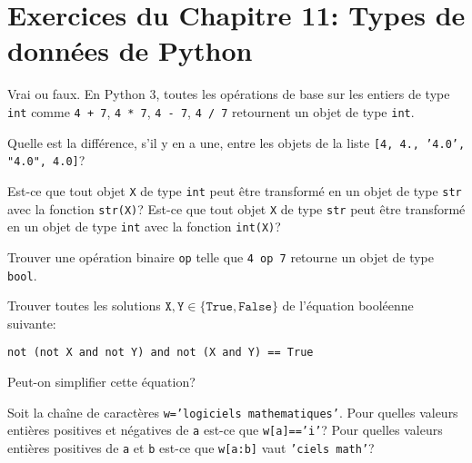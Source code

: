 
\section*{Exercices du Chapitre 11: Types de données de Python}

\begin{exercice}
    Vrai ou faux.
    En Python 3, toutes les opérations de base sur les entiers de type
    \texttt{int} comme 
    \texttt{4 + 7},
    \texttt{4 * 7},
    \texttt{4 - 7},
    \texttt{4 / 7}
    retournent un objet de type \texttt{int}.
\end{exercice}

\begin{exercice}
    Quelle est la différence, s'il y en a une, entre les objets de la liste
    \texttt{[4, 4., '4.0', "4.0", 4.0]}?
\end{exercice}

\begin{exercice}
    Est-ce que tout objet \texttt{X} de type \texttt{int} peut être
    transformé en un objet de type \texttt{str} avec la fonction
    \texttt{str(X)}?
    Est-ce que tout objet \texttt{X} de type \texttt{str} peut être
    transformé en un objet de type \texttt{int} avec la fonction
    \texttt{int(X)}?
\end{exercice}

\begin{exercice}
    Trouver une opération binaire \texttt{op} 
    telle que \texttt{4 op 7} retourne un objet de type \texttt{bool}.
\end{exercice}

\begin{exercice}
    Trouver toutes les solutions $\texttt{X},\texttt{Y}\in\{\texttt{True},
    \texttt{False}\}$ de l'équation booléenne suivante: 
    \begin{center}
	\texttt{not (not X and not Y) and not (X and Y) == True}
    \end{center}
    Peut-on simplifier cette équation?
\end{exercice}

\begin{exercice}
    Soit la chaîne de caractères \texttt{w='logiciels mathematiques'}. 
Pour quelles valeurs entières positives et négatives de \texttt{a} est-ce que
\texttt{w[a]=='i'}?
Pour quelles valeurs entières positives de \texttt{a} et \texttt{b} est-ce que
\texttt{w[a:b]} vaut \texttt{'ciels math'}?
\end{exercice}



